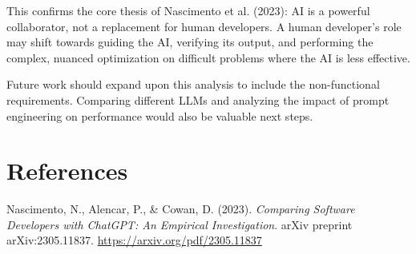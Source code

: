 \documentclass[12pt, a4paper]{article}
\begin{document}
This confirms the core thesis of Nascimento et al. (2023): AI is a powerful collaborator, not a replacement for human developers. A human developer's role may shift towards guiding the AI, verifying its output, and performing the complex, nuanced optimization on difficult problems where the AI is less effective.

Future work should expand upon this analysis to include the non-functional requirements. Comparing different LLMs and analyzing the impact of prompt engineering on performance would also be valuable next steps.

\section{References}

Nascimento, N., Alencar, P., \& Cowan, D. (2023). \textit{Comparing Software Developers with ChatGPT: An Empirical Investigation}. arXiv preprint arXiv:2305.11837. \url{https://arxiv.org/pdf/2305.11837}
\end{document}
